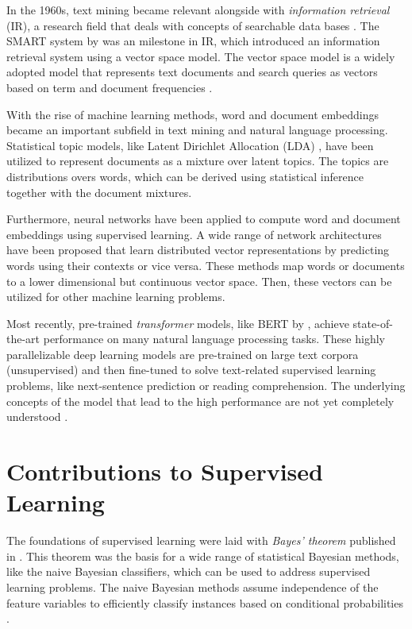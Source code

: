 In the 1960s, text mining became relevant alongside with \textit{information retrieval} (IR), a research field that deals with concepts of searchable data bases \cite{DBLP:journals/debu/Singhal01}.
The SMART system \cite{DBLP:journals/cacm/SaltonL65} by \citeauthor{DBLP:journals/cacm/SaltonL65} was an milestone in IR, which introduced an information retrieval system using a vector space model.
The vector space model is a widely adopted model that represents text documents and search queries as vectors based on term and document frequencies \cite{DBLP:journals/cacm/SaltonWY75}.

With the rise of machine learning methods, word and document embeddings became an important subfield in text mining and natural language processing.
Statistical topic models, like Latent Dirichlet Allocation (LDA) \cite{DBLP:journals/jmlr/BleiNJ03}, have been utilized to represent documents as a mixture over latent topics.
The topics are distributions overs words, which can be derived using statistical inference together with the document mixtures.

Furthermore, neural networks have been applied to compute word \cite{DBLP:journals/corr/abs-1301-3781} and document embeddings \cite{DBLP:conf/icml/LeM14} using supervised learning.
A wide range of network architectures have been proposed that learn distributed vector representations by predicting words using their contexts or vice versa.
These methods map words or documents to a lower dimensional but continuous vector space.
Then, these vectors can be utilized for other machine learning problems.

Most recently, pre-trained \textit{transformer} models, like BERT \cite{DBLP:conf/naacl/DevlinCLT19} by \citeauthor{DBLP:conf/naacl/DevlinCLT19}, achieve state-of-the-art performance on many natural language processing tasks.
These highly parallelizable deep learning models are pre-trained on large text corpora (unsupervised) and then fine-tuned to solve text-related supervised learning problems, like next-sentence prediction or reading comprehension.
The underlying concepts of the model that lead to the high performance are not yet completely understood \cite{DBLP:conf/emnlp/KovalevaRRR19}.

\section{Contributions to Supervised Learning}

The foundations of supervised learning were laid with \textit{Bayes' theorem} published in \citeyear{bayes1763lii} \cite{bayes1763lii}.
This theorem was the basis for a wide range of statistical Bayesian methods, like the naive Bayesian classifiers, which can be used to address supervised learning problems.
The naive Bayesian methods assume independence of the feature variables to efficiently classify instances based on conditional probabilities \cite{hand2001idiot}.


